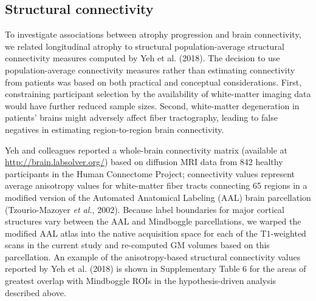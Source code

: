 \documentclass[]{article}
\begin{document}
\subsection*{Structural connectivity}\label{structural-connectivity}

To investigate associations between atrophy progression and brain
connectivity, we related longitudinal atrophy to structural
population-average structural connectivity measures computed by Yeh et
al. (2018). The decision to use population-average connectivity measures
rather than estimating connectivity from patients was based on both
practical and conceptual considerations. First, constraining participant
selection by the availability of white-matter imaging data would have
further reduced sample sizes. Second, white-matter degeneration in
patients' brains might adversely affect fiber tractography, leading to
false negatives in estimating region-to-region brain connectivity.

Yeh and colleagues reported a whole-brain connectivity matrix (available
at \url{http://brain.labsolver.org/}) based on diffusion MRI data from
842 healthy participants in the Human Connectome Project; connectivity
values represent average anisotropy values for white-matter fiber tracts
connecting 65 regions in a modified version of the Automated Anatomical
Labeling (AAL) brain parcellation (Tzourio-Mazoyer \emph{et al.}, 2002).
Because label boundaries for major cortical structures vary between the
AAL and Mindboggle parcellations, we warped the modified AAL atlas into
the native acquisition space for each of the T1-weighted scans in the
current study and re-computed GM volumes based on this parcellation. An
example of the anisotropy-based structural connectivity values reported
by Yeh et al. (2018) is shown in Supplementary Table 6 for the areas of
greatest overlap with Mindboggle ROIs in the hypothesis-driven analysis
described above.
\end{document}
